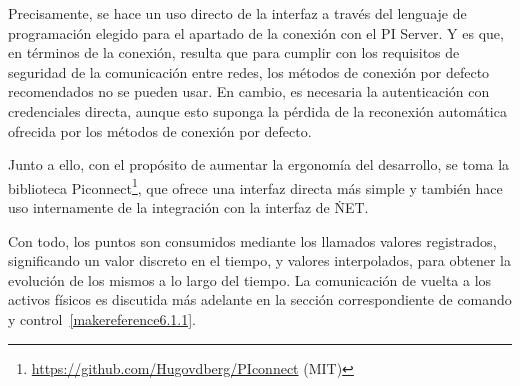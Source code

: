Precisamente, se hace un uso directo de la interfaz a través del lenguaje de programación elegido para el apartado de la conexión con el PI Server. Y es que, en términos de la conexión, resulta que para cumplir con los requisitos de seguridad de la comunicación entre redes, los métodos de conexión por defecto recomendados no se pueden usar. En cambio, es necesaria la autenticación con credenciales directa, aunque esto suponga la pérdida de la reconexión automática ofrecida por los métodos de conexión por defecto.

Junto a ello, con el propósito de aumentar la ergonomía del desarrollo, se toma la biblioteca Piconnect\footnote{\url{https://github.com/Hugovdberg/PIconnect} (MIT)}, que ofrece una interfaz directa más simple y también hace uso internamente de la integración con la interfaz de \.NET\@.

Con todo, los puntos son consumidos mediante los llamados valores registrados, significando un valor discreto en el tiempo, y valores interpolados, para obtener la evolución de los mismos a lo largo del tiempo. La comunicación de vuelta a los activos físicos es discutida más adelante en la sección correspondiente de comando y control~\ref{makereference6.1.1}.
